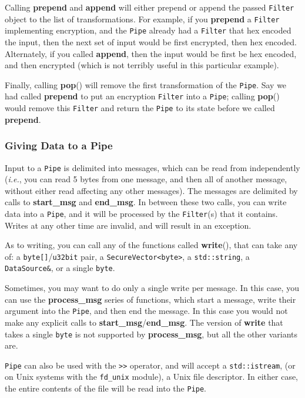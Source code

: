 \documentclass{article}
\newcommand{\function}[1]{\textbf{#1}}
\newcommand{\type}[1]{\texttt{#1}}
\newcommand{\ie}[0]{\emph{i.e.}}
\begin{document}
Calling \function{prepend} and \function{append} will either prepend
or append the passed \type{Filter} object to the list of
transformations. For example, if you \function{prepend} a
\type{Filter} implementing encryption, and the \type{Pipe} already had
a \type{Filter} that hex encoded the input, then the next set of
input would be first encrypted, then hex encoded. Alternately, if you
called \function{append}, then the input would be first be hex
encoded, and then encrypted (which is not terribly useful in this
particular example).

Finally, calling \function{pop}() will remove the first transformation
of the \type{Pipe}. Say we had called \function{prepend} to put an
encryption \type{Filter} into a \type{Pipe}; calling \function{pop}()
would remove this \type{Filter} and return the \type{Pipe} to its
state before we called \function{prepend}.

\subsubsection{Giving Data to a Pipe}

Input to a \type{Pipe} is delimited into messages, which can be read from
independently (\ie, you can read 5 bytes from one message, and then all of
another message, without either read affecting any other messages). The
messages are delimited by calls to \function{start\_msg} and
\function{end\_msg}. In between these two calls, you can write data into a
\type{Pipe}, and it will be processed by the \type{Filter}(s) that it
contains. Writes at any other time are invalid, and will result in an
exception.

As to writing, you can call any of the functions called \function{write}(),
that can take any of: a \type{byte[]}/\type{u32bit} pair, a
\type{SecureVector<byte>}, a \type{std::string}, a \type{DataSource\&}, or a
single \type{byte}.

Sometimes, you may want to do only a single write per message. In this case,
you can use the \function{process\_msg} series of functions, which start a
message, write their argument into the \type{Pipe}, and then end the
message. In this case you would not make any explicit calls to
\function{start\_msg}/\function{end\_msg}. The version of \function{write}
that takes a single \type{byte} is not supported by \function{process\_msg},
but all the other variants are.

\type{Pipe} can also be used with the \verb|>>| operator, and will accept a
\type{std::istream}, (or on Unix systems with the \verb|fd_unix| module), a
Unix file descriptor. In either case, the entire contents of the file will be
read into the \type{Pipe}.
\end{document}
